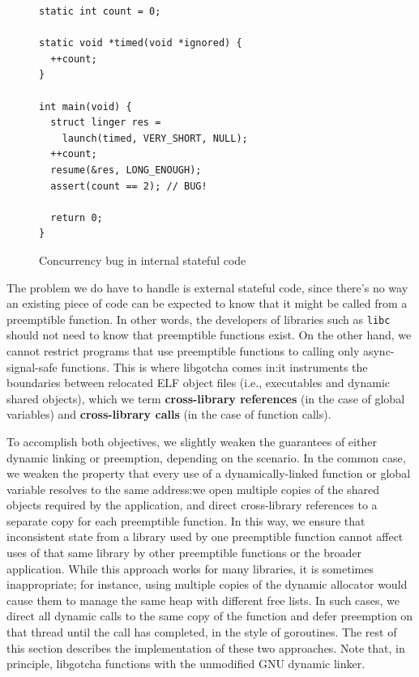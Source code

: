 \begin{figure}
\begin{verbatim}
static int count = 0;

static void *timed(void *ignored) {
  ++count;
}

int main(void) {
  struct linger res =
    launch(timed, VERY_SHORT, NULL);
  ++count;
  resume(&res, LONG_ENOUGH);
  assert(count == 2); // BUG!

  return 0;
}
\end{verbatim}
\caption{Concurrency bug in internal stateful code}
\label{fig:bug}
\end{figure}

The problem we do have to handle is external stateful code, since there's no way an
existing piece of code can be expected to know that it might be called from a
preemptible function.  In other words, the developers of libraries such as
\texttt{libc} should not need to know that preemptible functions exist.  On the other
hand, we cannot restrict programs that use preemptible functions to calling only
async-signal-safe functions.  This is where libgotcha comes in:\@ it instruments the
boundaries between relocated ELF object files (i.e., executables and dynamic shared
objects), which we term \textbf{cross-library references} (in the case of global
variables) and \textbf{cross-library calls} (in the case of function calls).


To accomplish both objectives, we slightly weaken the guarantees of either dynamic
linking or preemption, depending on the scenario.  In the common case, we weaken the
property that every use of a dynamically-linked function or global variable resolves
to the same address:\@ we open multiple copies of the shared objects required by the
application, and direct cross-library references to a separate copy for each
preemptible function.  In this way, we ensure that inconsistent state from a library
used by one preemptible function cannot affect uses of that same library by other
preemptible functions or the broader application.  While this approach works for many
libraries, it is sometimes inappropriate; for instance, using multiple copies of the
dynamic allocator would cause them to manage the same heap with different free lists.
In such cases, we direct all dynamic calls to the same copy of the function and defer
preemption on that thread until the call has completed, in the style of goroutines.
The rest of this section describes the implementation of these two approaches.  Note
that, in principle, libgotcha functions with the unmodified GNU dynamic linker.

